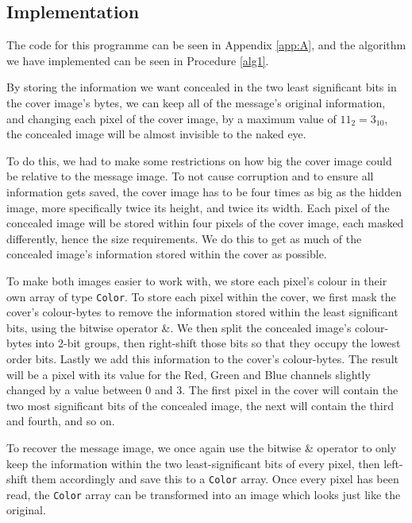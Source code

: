 \subsection{Implementation}
\label{sec:lsb-implementation}

The code for this programme can be seen in Appendix \ref{app:A}, and the algorithm we have implemented can be seen in Procedure \ref{alg1}.

By storing the information we want concealed in the two least significant bits in the cover image's bytes, we can keep all of the message's original information, and changing each pixel of the cover image, by a maximum value of $11_2=3_{10}$, the concealed image will be almost invisible to the naked eye.

To do this, we had to make some restrictions on how big the cover image could be relative to the message image.
To not cause corruption and to ensure all information gets saved, the cover image has to be four times as big as the hidden image, more specifically twice its height, and twice its width.
Each pixel of the concealed image will be stored within four pixels of the cover image, each masked differently, hence the size requirements.
We do this to get as much of the concealed image's information stored within the cover as possible.

To make both images easier to work with, we store each pixel's colour in their own array of type \lstinline|Color|.
To store each pixel within the cover, we first mask the cover's colour-bytes to remove the information stored within the least significant bits, using the bitwise operator \&.
We then split the concealed image's colour-bytes into 2-bit groups, then right-shift those bits so that they occupy the lowest order bits. Lastly we add this information to the cover's colour-bytes.
The result will be a pixel with its value for the Red, Green and Blue channels slightly changed by a value between 0 and 3.
The first pixel in the cover will contain the two most significant bits of the concealed image, the next will contain the third and fourth, and so on.

To recover the message image, we once again use the bitwise \& operator to only keep the information within the two least-significant bits of every pixel, then left-shift them accordingly and save this to a \lstinline|Color| array.
Once every pixel has been read, the \lstinline|Color| array can be transformed into an image which looks just like the original.

